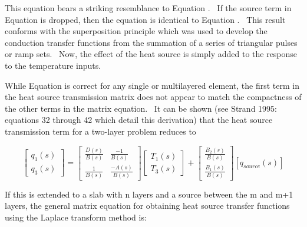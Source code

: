This equation bears a striking resemblance to Equation .~ If the source term in Equation is dropped, then the equation is identical to Equation .~ This result conforms with the superposition principle which was used to develop the conduction transfer functions from the summation of a series of triangular pulses or ramp sets.~ Now, the effect of the heat source is simply added to the response to the temperature inputs.

While Equation is correct for any single or multilayered element, the first term in the heat source transmission matrix does not appear to match the compactness of the other terms in the matrix equation.~ It can be shown (see Strand 1995: equations 32 through 42 which detail this derivation) that the heat source transmission term for a two-layer problem reduces to

\begin{equation}
\left[ {\begin{array}{*{20}{c}}{{q_1}\left( s \right)}\\ {{q_3}\left( s \right)}\end{array}} \right] = \left[ {\begin{array}{*{20}{c}}{\frac{{D\left( s \right)}}{{B\left( s \right)}}}&{\frac{{ - 1}}{{B\left( s \right)}}}\\ {\frac{1}{{B\left( s \right)}}}&{\frac{{ - A\left( s \right)}}{{B\left( s \right)}}}\end{array}} \right]\left[ {\begin{array}{*{20}{c}}{{T_1}\left( s \right)}\\ {{T_3}\left( s \right)}\end{array}} \right] + \left[ {\begin{array}{*{20}{c}}{\frac{{{B_2}\left( s \right)}}{{B\left( s \right)}}}\\ {\frac{{{B_1}\left( s \right)}}{{B\left( s \right)}}}\end{array}} \right]\left[ {{q_{source}}\left( s \right)} \right]
\end{equation}

If this is extended to a slab with n layers and a source between the m and m+1 layers, the general matrix equation for obtaining heat source transfer functions using the Laplace transform method is:

